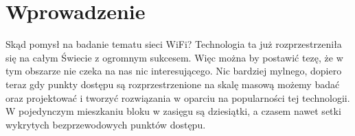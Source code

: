 \chapter*{Wprowadzenie}
\label{ch:wprowadz}

Skąd pomysł na badanie tematu sieci WiFi? Technologia ta już rozprzestrzeniła się na całym Świecie z ogromnym sukcesem. Więc można by postawić tezę, że w tym obszarze nie czeka na nas nic interesującego. Nic bardziej mylnego, dopiero teraz gdy punkty dostępu są rozprzestrzenione na skalę masową możemy badać oraz projektować i tworzyć rozwiązania w oparciu na popularności tej technologii. W pojedynczym mieszkaniu bloku w zasięgu są dziesiątki, a czasem nawet setki wykrytych bezprzewodowych punktów dostępu. 

